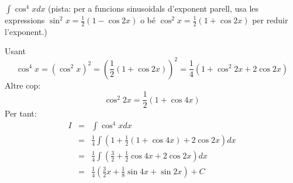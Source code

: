 \Exercise[title={$\int \sin^m x \cos^n x dx$ amb \(m , n \in Z^+\) i $m,n$ parells}]


$\int \cos^4{x}dx$ (pista: per a funcions sinusoidals d'exponent parell, usa les expressions $\sin^2{x}=\frac{1}{2}(1-\cos{2x})$ o bé $\cos^2{x}=\frac{1}{2}(1+\cos{2x})$ per reduir l'exponent.)



\Answer


    Usant
    \[
    \cos^4{x} =\left(\cos^2{x}\right)^2
              =\left(\frac{1}{2}(1+\cos{2x})\right)^2
              =\frac{1}{4}\left(1+\cos^2{2x}+2\cos{2x}\right)
    \]
    Altre cop:
    \[
    \cos^2{2x} = \frac{1}{2}(1+\cos{4x})
    \]
    Per tant:
    \begin{eqnarray*}
      I&=&\int \cos^4{x}dx \\
      &=& \frac{1}{4} \int \left(1+\frac{1}{2}(1+\cos{4x})+2\cos{2x}\right) dx\\
      &=& \frac{1}{4} \int \left(\frac{3}{2}+\frac{1}{2}\cos{4x}+2\cos{2x}\right) dx\\
      &=& \frac{1}{4} \left(\frac{3}{2}x +\frac{1}{8}\sin{4x}+\sin{2x}\right)+C
    \end{eqnarray*}

